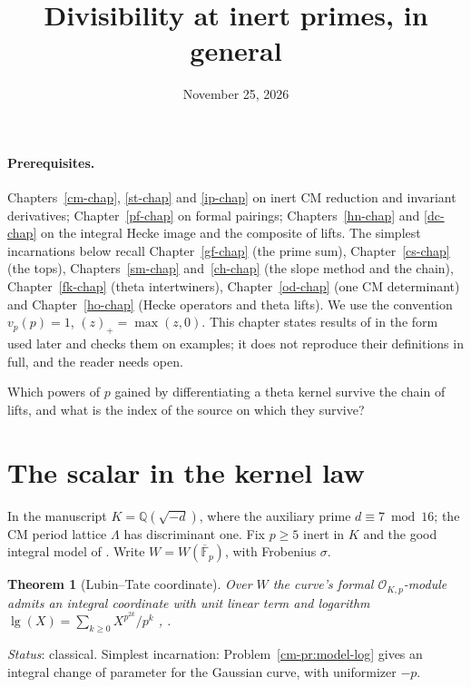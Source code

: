 \documentclass[reqno]{amsart}
\title{Divisibility at inert primes, in general}
\author{}
\date{November 25, 2026}
\newcounter{chap}
\theoremstyle{definition}
\theoremstyle{plain}
\newtheorem{theorem}{Theorem}[section]
\newcommand{\Q}{\mathbb Q}
\newcommand{\Oc}{\mathcal O}
\begin{document}
\maketitle
{}\label{chap}

\paragraph{Prerequisites.}
Chapters~\ref{cm-chap}, \ref{st-chap} and \ref{ip-chap} on inert CM reduction and invariant derivatives;
Chapter~\ref{pf-chap} on formal pairings; Chapters~\ref{hn-chap} and \ref{dc-chap} on the integral Hecke image and the composite of lifts.  The simplest incarnations below recall Chapter~\ref{gf-chap} (the prime sum), Chapter~\ref{cs-chap} (the tops), Chapters~\ref{sm-chap} and~\ref{ch-chap} (the slope method and the chain), Chapter~\ref{fk-chap} (theta intertwiners), Chapter~\ref{od-chap} (one CM determinant) and Chapter~\ref{ho-chap} (Hecke operators and theta lifts).  We use the convention \(v_p(p)=1\), \((z)_+=\max(z,0)\).  This chapter states results of \cite[\S\S8--12]{Adr} in the form used later and checks them on examples; it does not reproduce their definitions in full, and the reader needs \cite[\S\S8--12]{Adr} open.

Which powers of \(p\) gained by differentiating a theta kernel survive the chain of lifts, and what is the index of the source on which they survive?

\section{The scalar in the kernel law}\label{sec:kernel}
In the manuscript \(K=\Q(\sqrt{-d})\), where the auxiliary prime \(d\equiv7\bmod16\); the CM period lattice \(\Lambda\) has discriminant one. Fix \(p\ge5\) inert in \(K\) and the good integral model of \cite[\S8.2]{Adr}. Write \(W=W(\overline{\mathbb F}_p)\), with Frobenius \(\sigma\).

\begin{theorem}[Lubin--Tate coordinate]\label{thm:LT}
Over \(W\) the curve's formal \(\Oc_{K,p}\)-module admits an integral coordinate with unit linear term and logarithm \(\operatorname{lg}(X)=\sum_{k\ge0}X^{p^{2k}}/p^k\) \cite{LT}, \cite[Prop.~8.11]{Adr}.
\end{theorem}
\noindent \emph{Status}: classical. Simplest incarnation: Problem~\ref{cm-pr:model-log} gives an integral change of parameter for the Gaussian curve, with uniformizer \(-p\).
\end{document}
